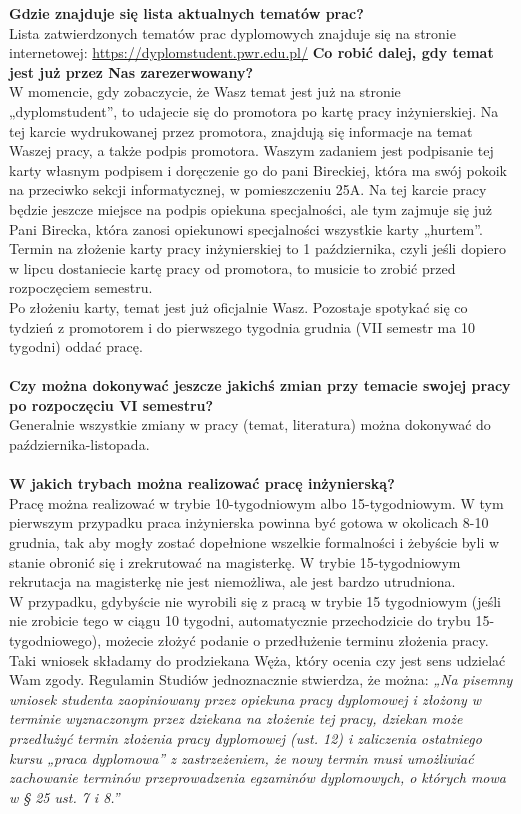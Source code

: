 \documentclass[11pt]{article}
\begin{document}
\textbf{Gdzie znajduje się lista aktualnych tematów prac?} \\
\indent Lista zatwierdzonych tematów prac dyplomowych znajduje się na stronie internetowej: {\color{blue}\url{https://dyplomstudent.pwr.edu.pl/}}
\newpage
\noindent \textbf{Co robić dalej, gdy temat jest już przez Nas zarezerwowany?} \\
\indent W momencie, gdy zobaczycie, że Wasz temat jest już na stronie „dyplomstudent”, to udajecie się do promotora po kartę pracy inżynierskiej. Na tej karcie wydrukowanej przez promotora, znajdują się informacje na temat Waszej pracy, a także podpis promotora. Waszym zadaniem jest podpisanie tej karty własnym podpisem i doręczenie go do pani Bireckiej, która ma swój pokoik na przeciwko sekcji informatycznej, w pomieszczeniu 25A. Na tej karcie pracy będzie jeszcze miejsce na podpis opiekuna specjalności, ale tym zajmuje się już Pani Birecka, która zanosi opiekunowi specjalności wszystkie karty „hurtem”. Termin na złożenie karty pracy inżynierskiej to 1 października, czyli jeśli dopiero
w lipcu dostaniecie kartę pracy od promotora, to musicie to zrobić przed rozpoczęciem semestru. \\
\indent Po złożeniu karty, temat jest już oficjalnie Wasz. Pozostaje spotykać się co tydzień z promotorem i do pierwszego tygodnia grudnia (VII semestr ma 10 tygodni) oddać pracę. \\\\
\textbf{Czy można dokonywać jeszcze jakichś zmian przy temacie swojej pracy po rozpoczęciu VI semestru?} \\
\indent Generalnie wszystkie zmiany w pracy (temat, literatura) można dokonywać do października-listopada. \\\\
\textbf{W jakich trybach można realizować pracę inżynierską?} \\
\indent Pracę można realizować w trybie 10-tygodniowym albo 15-tygodniowym. W tym pierwszym przypadku praca inżynierska powinna być gotowa w okolicach 8-10 grudnia, tak aby mogły zostać dopełnione wszelkie formalności i żebyście byli w stanie obronić się i zrekrutować na magisterkę. W trybie 15-tygodniowym rekrutacja na magisterkę nie jest niemożliwa, ale jest bardzo utrudniona. \\
\indent W przypadku, gdybyście nie wyrobili się z pracą w trybie 15 tygodniowym (jeśli nie zrobicie tego w ciągu 10 tygodni, automatycznie przechodzicie do trybu 15-tygodniowego), możecie złożyć podanie o przedłużenie terminu złożenia pracy. Taki wniosek składamy do prodziekana Węża, który ocenia czy jest sens udzielać Wam zgody. Regulamin Studiów jednoznacznie stwierdza, że można:\textit{
„Na pisemny wniosek studenta zaopiniowany przez opiekuna pracy dyplomowej i złożony w terminie wyznaczonym przez dziekana na złożenie tej pracy, dziekan może przedłużyć termin złożenia pracy dyplomowej (ust. 12) i zaliczenia ostatniego kursu „praca dyplomowa” z zastrzeżeniem, że nowy termin musi umożliwiać zachowanie terminów przeprowadzenia egzaminów dyplomowych, o których mowa w § 25 ust. 7 i 8.”}
\end{document}
